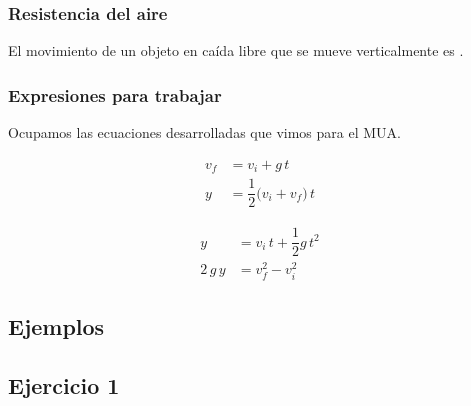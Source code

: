\documentclass[14pt]{beamer}
\begin{document}
\begin{frame}
\frametitle{Resistencia del aire}
El movimiento de un objeto en caída libre que se mueve verticalmente es .
\end{frame}
\begin{frame}
\frametitle{Expresiones para trabajar}
Ocupamos las ecuaciones desarrolladas que vimos para el MUA.
\pause
\begin{minipage}{0.4\linewidth}
\begin{align*}
v_{f} &= v_{i} + g \, t \\[0.5em]
y &= \dfrac{1}{2} \big( v_{i} + v_{f} \big) \, t
\end{align*}
\end{minipage}
\hspace{1cm}
\begin{minipage}{0.4\linewidth}
\begin{align*}
y &= v_{i} \, t + \dfrac{1}{2} g \, t^{2} \\[0.5em]
2 \, g \, y &= v_{f}^{2} - v_{i}^{2} 
\end{align*}
\end{minipage}
\end{frame}

\subsection{Ejemplos}
\subsection*{Ejercicio 1}
\end{document}
